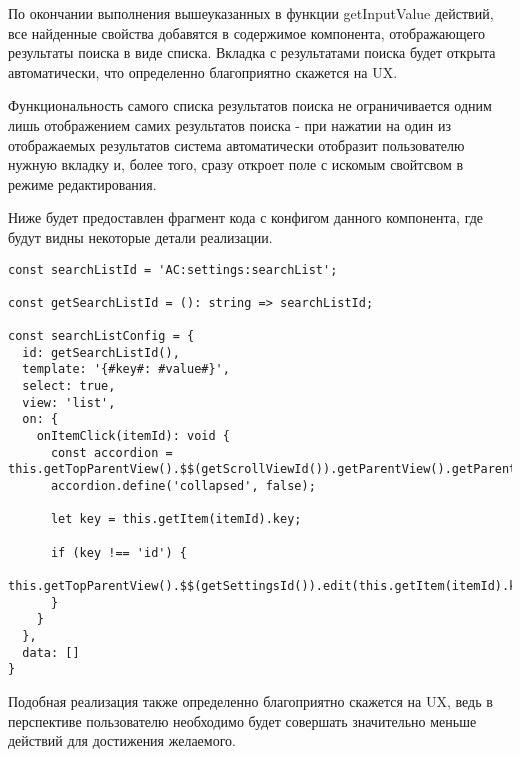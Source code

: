 По окончании выполнения вышеуказанных в функции getInputValue действий, все найденные свойства добавятся в содержимое компонента, отображающего результаты поиска в виде списка. Вкладка с результатами поиска будет открыта автоматически, что определенно благоприятно скажется на UX.

Функциональность самого списка результатов поиска не ограничивается одним лишь отображением самих результатов поиска - при нажатии на один из отображаемых результатов система автоматически отобразит пользователю нужную вкладку и, более того, сразу откроет поле с искомым свойтсвом в режиме редактирования.

Ниже будет предоставлен фрагмент кода с конфигом данного компонента, где будут видны некоторые детали реализации.

\begin{lstlisting}
const searchListId = 'AC:settings:searchList';

const getSearchListId = (): string => searchListId;

const searchListConfig = {
  id: getSearchListId(),
  template: '{#key#: #value#}',
  select: true,
  view: 'list',
  on: {
    onItemClick(itemId): void {
      const accordion = this.getTopParentView().$$(getScrollViewId()).getParentView().getParentView();
      accordion.define('collapsed', false);

      let key = this.getItem(itemId).key;

      if (key !== 'id') {
        this.getTopParentView().$$(getSettingsId()).edit(this.getItem(itemId).key);
      }
    }
  },
  data: []
}
\end{lstlisting}

Подобная реализация также определенно благоприятно скажется на UX, ведь в перспективе пользователю необходимо будет совершать значительно меньше действий для достижения желаемого.